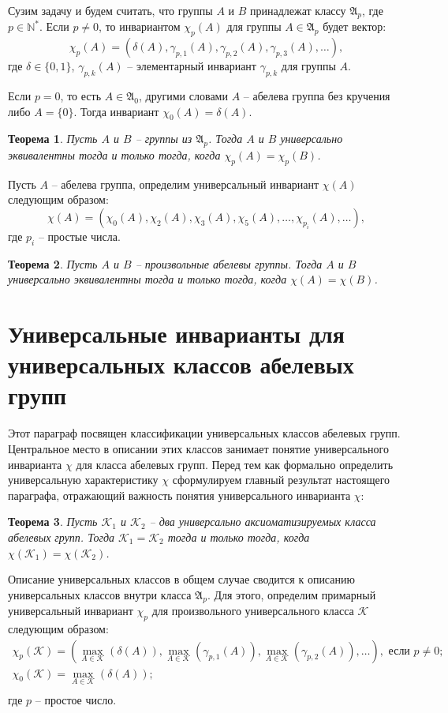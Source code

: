 \documentclass[a4paper,11pt,twoside]{article}
\newtheorem{theorem}{Теорема}[section]
\def\A{{\mathfrak{A}}}
\def\K{{\mathcal{K}}}
\def\N{{\mathbb{N}}}
\begin{document}
Сузим задачу и будем считать, что группы $A$ и $B$ принадлежат классу $\A_p$, где $p \in \N^*$. Если $p \neq 0$, то инвариантом $\chi_p(A)$ для группы $A \in \A_p$ будет вектор:
$$\chi_p(A) = (\delta(A), \gamma_{p,1}(A), \gamma_{p,2}(A), \gamma_{p,3}(A), \ldots),$$
где $\delta \in \{0,1\}$, $\gamma_{p,k}(A)$ -- элементарный инвариант $\gamma_{p,k}$ для группы $A$.

Если $p = 0$, то есть $A \in \A_0$, другими словами $A$ -- абелева группа без кручения либо $A = \{0\}$. Тогда инвариант $\chi_0(A) = \delta(A)$.

\begin{theorem}
Пусть $A$ и $B$ -- группы из $\A_p$. Тогда $A$ и $B$ универсально эквивалентны тогда и только тогда, когда $\chi_p(A) = \chi_p(B)$.
\end{theorem}

Пусть $A$ -- абелева группа, определим универсальный инвариант $\chi(A)$ следующим образом:
$$\chi(A) = (\chi_{0}(A), \chi_{2}(A), \chi_{3}(A),\chi_{5}(A),\ldots, \chi_{p_i}(A), \ldots),$$
где $p_i$ -- простые числа.

\begin{theorem}
Пусть $A$ и $B$ -- произвольные абелевы группы. Тогда $A$ и $B$ универсально эквивалентны тогда и только тогда, когда $\chi(A) = \chi(B)$.
\end{theorem}


\section{Универсальные инварианты для универсальных классов абелевых групп}

Этот параграф посвящен классификации универсальных классов абелевых групп. Центральное место в описании этих классов занимает понятие универсального инварианта $\chi$ для класса абелевых групп. Перед тем как формально определить универсальную характеристику $\chi$ сформулируем главный результат настоящего параграфа, отражающий важность понятия универсального инварианта $\chi$: 

\begin{theorem}\label{th:UnivClasses}
Пусть $\K_1$ и $\K_2$ -- два универсально аксиоматизируемых класса абелевых групп. Тогда $\K_1 = \K_2$ тогда и только тогда, когда $\chi(\K_1) = \chi(\K_2)$.
\end{theorem}

Описание универсальных классов в общем случае сводится к описанию универсальных классов внутри класса $\A_p$. Для этого, определим примарный универсальный инвариант $\chi_p$ для произвольного универсального класса $\K$ следующим образом:
$$\begin{array}{c}
\chi_p(\K) = (\max\limits_{A \in \K}(\delta(A)),  \max\limits_{A \in \K}(\gamma_{p,1}(A)), \max\limits_{A \in \K}(\gamma_{p,2}(A)), \ldots), \text{ если } p \neq 0; \\
\chi_0(\K) = \max\limits_{A \in \K}(\delta(A)); \\
\end{array}$$
где $p$ -- простое число.
\end{document}
